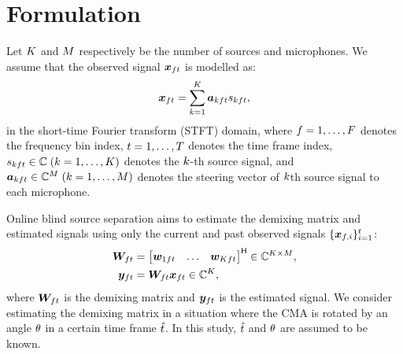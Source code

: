 \documentclass{article}
\begin{document}
\section{Formulation}
Let $K$ and $M$ respectively be the number of sources and microphones.
We assume that the observed signal $\bm{x} _{ft}$ is modelled as:
\begin{equation}
  \bm{x} _{ft} = \sum _{k=1} ^{K} \bm{a} _{kft} s _{kft},
\end{equation}
in the short-time Fourier transform (STFT) domain,
where $f = 1, \dots, F$ denotes the frequency bin index,
$t = 1, \dots, T$ denotes the time frame index,
$s _{kft} \in \mathbb{C}\; (k = 1, \dots, K)$ denotes the $k$-th source signal, and
$\bm{a} _{kft} \in \mathbb{C} ^{M}\; (k = 1, \dots, M)$ denotes the steering vector of $k$th source signal to each microphone.

Online blind source separation aims to estimate the demixing matrix and estimated signals using only the current and past observed signals $\{\bm{x} _{f,i}\} _{i=1} ^{t}$:
\begin{align}
  \bm{W} _{ft} &= \begin{bmatrix} \bm{w} _{1ft} & \dots & \bm{w} _{Kft} \end{bmatrix} ^{\mathsf{H}} \in \mathbb{C} ^{K \times M}, \\
  \bm{y} _{ft} &= \bm{W} _{ft} \bm{x} _{ft} \in \mathbb{C} ^{K},
\end{align}
where $\bm{W} _{ft}$ is the demixing matrix and $\bm{y} _{ft}$ is the estimated signal.
We consider estimating the demixing matrix in a situation where the CMA is rotated by an angle $\theta$ in a certain time frame $\hat{t}$.
In this study, $\hat{t}$ and $\theta$ are assumed to be known.
\end{document}
